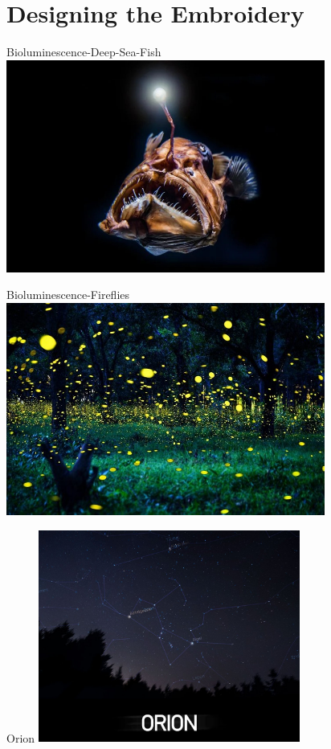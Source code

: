 \documentclass[aspectratio=169]{beamer}
\begin{document}
\part{Designing the Embroidery}
\begin{frame}[fragile]{Bioluminescence-Deep-Sea-Fish}
\includegraphics[height=2.75in]{Bioluminescence-Deep-Sea-Fish-777x518.jpg}
\end{frame}
\begin{frame}[fragile]{Bioluminescence-Fireflies}
\includegraphics[height=2.75in]{Bioluminescence-Fireflies-777x518.jpg}
\end{frame}
\begin{frame}[fragile]{Orion}
\includegraphics[height=2.75in]{orion.jpg}
\end{frame}
\end{document}
